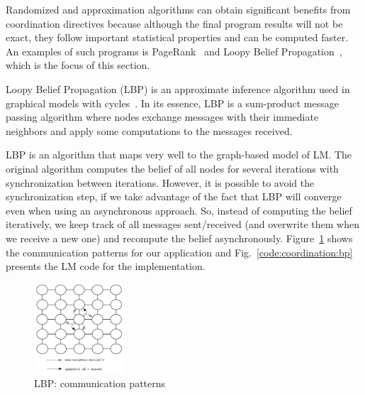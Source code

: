 Randomized and approximation algorithms can obtain significant benefits from
coordination directives because although the final program results will not be
exact, they follow important statistical properties and can be computed faster.
An examples of such programs is PageRank~\cite{Lubachevsky:1986:CAA:4904.4801}
and Loopy Belief Propagation~\cite{Gonzalez+al:aistats09paraml}, which is the
focus of this section.

Loopy Belief Propagation (LBP) is an approximate inference algorithm used in
graphical models with cycles~\cite{Murphy99loopybelief}. In its essence, LBP is
a sum-product message passing algorithm where nodes exchange messages with their
immediate neighbors and apply some computations to the messages received.

LBP is an algorithm that maps very well to the graph-based model of LM. The
original algorithm computes the belief of all nodes for several iterations with
synchronization between iterations. However, it is possible to avoid the
synchronization step, if we take advantage of the fact that LBP will converge
even when using an asynchronous approach. So, instead of computing the belief
iteratively, we keep track of all messages sent/received (and overwrite them
when we receive a new one) and recompute the belief asynchronously.
Figure~\ref{fig:coordination:bp} shows the communication patterns for our
application and Fig.~\ref{code:coordination:bp} presents the LM code for the
implementation.

\begin{figure}[h]
   \begin{center}
      \includegraphics[width=0.3\textwidth]{figures/bp/bp.pdf}
   \end{center}
\caption{LBP: communication patterns}
\label{fig:coordination:bp}
\end{figure}

